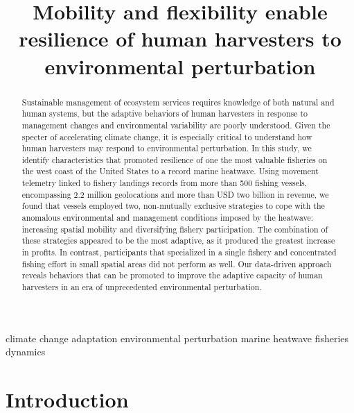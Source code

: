 \documentclass[]{elsarticle} %
\begin{document}
\begin{frontmatter}

  \title{Mobility and flexibility enable resilience of human harvesters to
environmental perturbation}
      
  \begin{abstract}
  Sustainable management of ecosystem services requires knowledge of both
  natural and human systems, but the adaptive behaviors of human
  harvesters in response to management changes and environmental
  variability are poorly understood. Given the specter of accelerating
  climate change, it is especially critical to understand how human
  harvesters may respond to environmental perturbation. In this study, we
  identify characteristics that promoted resilience of one the most
  valuable fisheries on the west coast of the United States to a record
  marine heatwave. Using movement telemetry linked to fishery landings
  records from more than 500 fishing vessels, encompassing 2.2 million
  geolocations and more than USD two billion in revenue, we found that
  vessels employed two, non-mutually exclusive strategies to cope with the
  anomalous environmental and management conditions imposed by the
  heatwave: increasing spatial mobility and diversifying fishery
  participation. The combination of these strategies appeared to be the
  most adaptive, as it produced the greatest increase in profits. In
  contrast, participants that specialized in a single fishery and
  concentrated fishing effort in small spatial areas did not perform as
  well. Our data-driven approach reveals behaviors that can be promoted to
  improve the adaptive capacity of human harvesters in an era of
  unprecedented environmental perturbation.
  \end{abstract}
   \begin{keyword} climate change adaptation \textbar{} environmental perturbation
\textbar{} marine heatwave \textbar{} fisheries dynamics\end{keyword}
 \end{frontmatter}

\hypertarget{intro}{%
\section{Introduction}\label{intro}}
\end{document}

